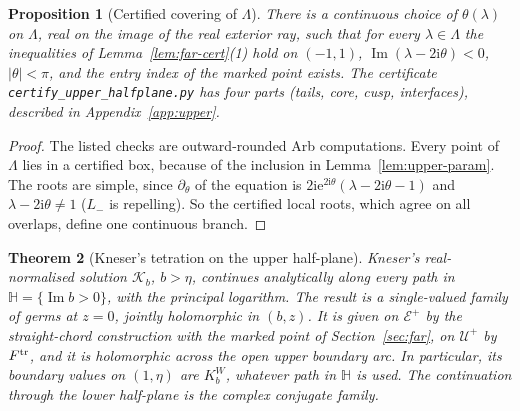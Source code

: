 \documentclass[11pt]{amsart}
\newtheorem{theorem}{Theorem}[section]
\newtheorem{proposition}[theorem]{Proposition}
\theoremstyle{definition}
\newcommand{\Kk}{K}
\newcommand{\eee}{\mathrm{e}}
\newcommand{\ii}{\mathrm{i}}
\begin{document}
\begin{proposition}[Certified covering of $\Lambda$]\label{prop:upper-cert}
There is a continuous choice of $\theta(\lambda)$ on $\Lambda$, real on the image of the real
exterior ray, such that for every $\lambda\in\Lambda$ the inequalities of
Lemma~\ref{lem:far-cert}(1) hold on $(-1,1)$, $\operatorname{Im}(\lambda-2\ii\theta)<0$, $|\theta|<\pi$, and the
entry index of the marked point exists.  The certificate \texttt{certify\_upper\_halfplane.py} has four parts (tails,
core, cusp, interfaces), described in Appendix~\ref{app:upper}.
\end{proposition}

\begin{proof}
The listed checks are outward-rounded Arb computations.  Every point of $\Lambda$
lies in a certified box, because of the inclusion in Lemma~\ref{lem:upper-param}.
The roots are simple, since $\partial_\theta$ of the equation is
$2\ii\eee^{2\ii\theta}(\lambda-2\ii\theta-1)$ and $\lambda-2\ii\theta\ne1$ ($L_-$ is repelling).  So the certified
local roots, which agree on all overlaps, define one continuous branch.
\end{proof}

\begin{theorem}[Kneser's tetration on the upper half-plane]\label{thm:upper}
Kneser's real-normalised solution $\mathcal K_b$, $b>\eta$, continues analytically along
every path in $\mathbb H=\{\operatorname{Im}b>0\}$, with the principal logarithm.  The result is a
single-valued family of germs at $z=0$, jointly holomorphic in $(b,z)$.  It is
given on $\mathcal E^+$ by the straight-chord construction with the marked point of
Section~\ref{sec:far}, on $\mathcal U^+$ by $F^{\rm tr}$, and it is holomorphic across the open
upper boundary arc.  In particular, its boundary values on $(1,\eta)$ are $\Kk^W_b$,
whatever path in $\mathbb H$ is used.  The continuation through the lower half-plane is
the complex conjugate family.
\end{theorem}
\end{document}
